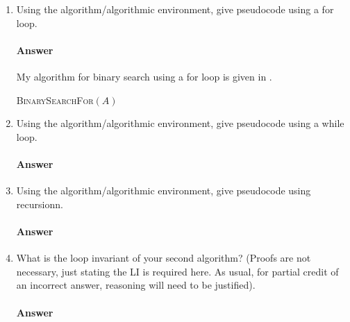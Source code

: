 \documentclass{article}
\begin{document}
\begin{enumerate}
    \item Using the algorithm/algorithmic environment,
        give pseudocode using a for loop.

        \paragraph{Answer} My algorithm for binary search using a for loop is given in .

        \begin{algorithm}
            \caption{\textsc{BinarySearchFor}$(A)$}\label{alg:forloop}
            \begin{algorithmic}
                \State {}
            \end{algorithmic}
        \end{algorithm}

    \item Using the algorithm/algorithmic environment, give pseudocode using a while loop.

        \paragraph{Answer}


    \item Using the algorithm/algorithmic environment, give pseudocode using
        recursionn.

        \paragraph{Answer}


    \item What is the loop invariant of your second algorithm? (Proofs are not
        necessary, just stating the LI is required here.  As usual, for partial
        credit of an incorrect answer, reasoning will need to be justified).

        \paragraph{Answer}

\end{enumerate}

\collab{\todo{}} 
\end{document}
